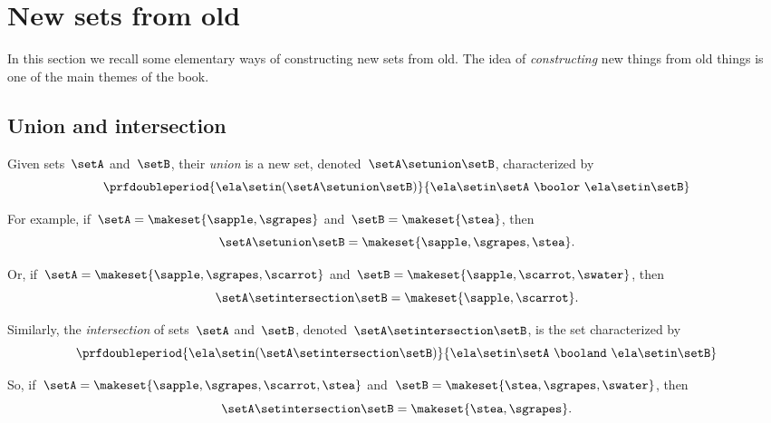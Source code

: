 
\section{New sets from old}

In this section we recall some elementary ways of constructing new sets from old.
%
The idea of \emph{constructing} new things from old things is one of the main themes of the book.

\subsection{Union and intersection}

Given sets~$\setA$ and~$\setB$, their \emph{union} is a new set, denoted~$\setA \setunion \setB$, characterized by
\begin{equation}
    \prfdoubleperiod
    {\ela \setin(\setA \setunion \setB)}{\ela \setin\setA \ \boolor\  \ela \setin\setB}
\end{equation}

For example, if~$\setA = \makeset{ \sapple, \sgrapes }$ and~$\setB = \makeset{ \stea }$, then
\begin{equation}
    \setA \setunion \setB = \makeset{ \sapple, \sgrapes, \stea }.
\end{equation}

Or, if~$\setA = \makeset{ \sapple, \sgrapes, \scarrot }$ and~$\setB = \makeset{ \sapple, \scarrot, \swater }$, then
\begin{equation}
    \setA \setintersection \setB = \makeset{ \sapple, \scarrot }.
\end{equation}

Similarly, the \emph{intersection} of sets~$\setA$ and~$\setB$, denoted~$\setA \setintersection \setB$, is the set characterized by
\begin{equation}
    \prfdoubleperiod{ \ela \setin(\setA \setintersection \setB)}{\ela \setin\setA \ \booland\ \ela \setin\setB}
\end{equation}

So, if~$\setA = \makeset{ \sapple, \sgrapes, \scarrot, \stea }$ and~$\setB = \makeset{ \stea, \sgrapes, \swater }$, then
\begin{equation}
    \setA \setintersection \setB = \makeset{ \stea, \sgrapes }.
\end{equation}


